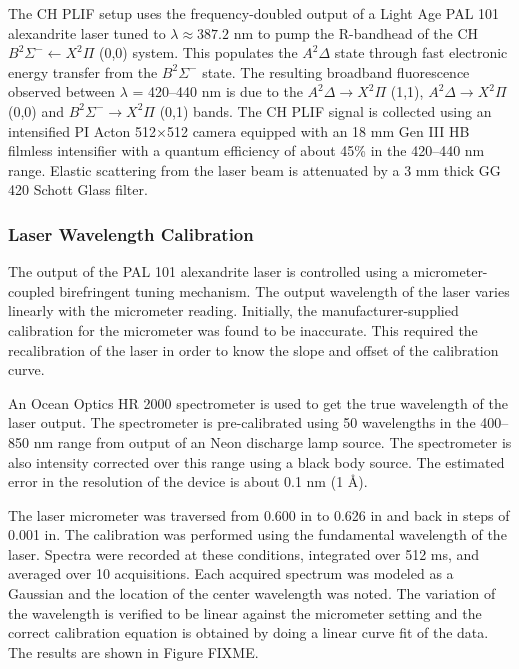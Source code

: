 The CH PLIF setup uses the frequency-doubled output of a Light Age PAL 101 alexandrite laser tuned to \(\lambda \approx 387.2\) nm to pump the R-bandhead of the CH \(B^2\Sigma^- \leftarrow X^2\Pi\) (0,0) system.
This populates the \(A^2\Delta\) state through fast electronic energy transfer from the \(B^2\Sigma^-\) state.
The resulting broadband fluorescence observed between \(\lambda\) = 420--440 nm is due to the \(A^2\Delta \rightarrow X^2\Pi\) (1,1), \(A^2\Delta \rightarrow X^2\Pi\) (0,0) and \(B^2\Sigma^- \rightarrow X^2\Pi\) (0,1) bands.
The CH PLIF signal is collected using an intensified PI Acton 512\(\times\)512 camera equipped with an 18 mm Gen III HB filmless intensifier with a quantum efficiency of about 45\% in the 420--440 nm range.
Elastic scattering from the laser beam is attenuated by a 3 mm thick GG 420 Schott Glass filter.

\subsubsection{Laser Wavelength Calibration}

The output of the PAL 101 alexandrite laser is controlled using a micrometer-coupled birefringent tuning mechanism.
The output wavelength of the laser varies linearly with the micrometer reading.
Initially, the manufacturer-supplied calibration for the micrometer was found to be inaccurate.
This required the recalibration of the laser in order to know the slope and offset of the calibration curve.

An Ocean Optics HR 2000 spectrometer is used to get the true wavelength of the laser output.
The spectrometer is pre-calibrated using 50 wavelengths in the 400--850 nm range from output of an Neon discharge lamp source.
The spectrometer is also intensity corrected over this range using a black body source.
The estimated error in the resolution of the device is about 0.1 nm (1 \AA).

The laser micrometer was traversed from 0.600 in to 0.626 in and back in steps of 0.001 in.
The calibration was performed using the fundamental wavelength of the laser.
Spectra were recorded at these conditions, integrated over 512 ms, and averaged over 10 acquisitions.
Each acquired spectrum was modeled as a Gaussian and the location of the center wavelength was noted.
The variation of the wavelength is verified to be linear against the micrometer setting and the correct calibration equation is obtained by doing a linear curve fit of the data.
The results are shown in Figure FIXME.

